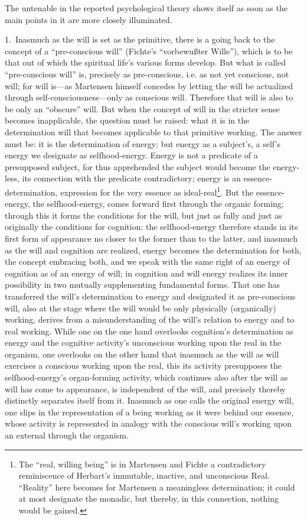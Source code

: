 \documentclass[12pt,a4paper]{book}
\begin{document}
The untenable in the reported psychological theory shows itself as soon as the
main points in it are more closely illuminated.

1.~Inasmuch as the will is set as the primitive, there is a going back to the
concept of a ``pre-conscious will'' (Fichte's ``vorbewußter Wille''), which is to
be that out of which the spiritual life's various forms develop. But what is called
``pre-conscious will'' is, precisely as pre-conscious, i.e. as not yet conscious, not
will; for will is---as Martensen himself concedes by letting the will be
actualized through self-consciousness---only as conscious will. Therefore that will
is also to be only an ``obscure'' will. But when the concept of will in the
stricter sense becomes inapplicable, the question must be raised: what it is in the
determination will that becomes applicable to that primitive working. The answer
must be: it is the determination of energy; but energy as a subject's, a self's
energy we designate as selfhood-energy. Energy is not a predicate of a presupposed
subject, for thus apprehended the subject would become the energy-less, its
connection with the predicate contradictory; energy is an essence-determination,
expression for the very essence as ideal-real\footnote{The ``real, willing
being'' is in Martensen and Fichte a contradictory reminiscence of Herbart's
immutable, inactive, and unconscious Real. ``Reality'' here becomes for Martensen
a meaningless determination; it could at most designate the monadic, but thereby,
in this connection, nothing would be gained.}. But the essence-energy, the
selfhood-energy, comes forward first through the organic forming; through this it
forms the conditions for the will, but just as fully and just as originally the
conditions for cognition: the selfhood-energy therefore stands in its first form
of appearance no closer to the former than to the latter, and inasmuch as the will
and cognition are realized, energy becomes the determination for both, the concept
embracing both, and we speak with the same right of an energy of cognition as of an
energy of will; in cognition and will energy realizes its inner possibility in two
mutually supplementing fundamental forms. That one has transferred the will's
determination to energy and designated it as pre-conscious will, also at the stage
where the will would be only physically (organically) working, derives from a
misunderstanding of the will's relation to energy and to real working. While one on
the one hand overlooks cognition's determination as energy and the cognitive
activity's unconscious working upon the real in the organism, one overlooks on the
other hand that inasmuch as the will as will exercises a conscious working upon the
real, this its activity presupposes the selfhood-energy's organ-forming activity,
which continues also after the will as will has come to appearance, is independent
of the will, and precisely thereby distinctly separates itself from it. Inasmuch as
one calls the original energy will, one slips in the representation of a being
working as it were behind our essence, whose activity is represented in analogy
with the conscious will's working upon an external through the organism.
\end{document}
